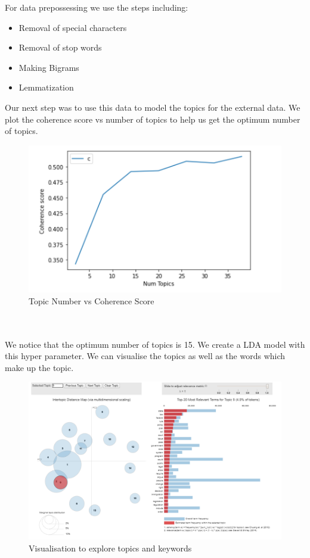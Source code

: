 \documentclass{article}
\begin{document}
For data prepossessing we use the steps including:
\begin{itemize}
	\item Removal of special characters
	\item Removal of stop words
    \item Making Bigrams 
    \item Lemmatization
\end{itemize}
Our next step was to use this data to model the topics for the external data. We plot the coherence score vs number of topics to help us get the optimum number of topics. 
\begin{figure}[H]
    \centering
    \includegraphics[scale=1.5]{score.PNG}
    \caption{Topic Number vs Coherence Score}
    \label{Topic Number vs Coherence Scorel}
\end{figure}
\\\\

We notice that the optimum number of topics is 15. We create a LDA model with this hyper parameter. We can visualise the topics as well as the words which make up the topic.
\begin{figure}[H]
    \centering
    \includegraphics[scale=0.7]{poli.PNG}
    \caption{Visualisation to explore topics and keywords}
    \label{Visualisation to explore topics and keywords}
\end{figure}
\\
\end{document}
